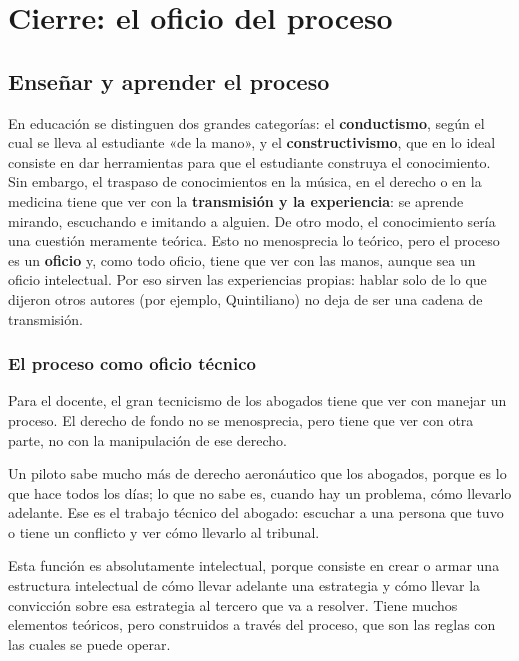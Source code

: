 \documentclass[12pt,oneside]{book}
\begin{document}
\chapter[Cierre: el oficio del proceso]{Cierre: el oficio del proceso}

\section{Enseñar y aprender el proceso}

En educación se distinguen dos grandes categorías: el \textbf{conductismo}, según el cual se lleva al estudiante «de la mano», y el \textbf{constructivismo}, que en lo ideal consiste en dar herramientas para que el estudiante construya el conocimiento. Sin embargo, el traspaso de conocimientos en la música, en el derecho o en la medicina tiene que ver con la \textbf{transmisión y la experiencia}: se aprende mirando, escuchando e imitando a alguien. De otro modo, el conocimiento sería una cuestión meramente teórica. Esto no menosprecia lo teórico, pero el proceso es un \textbf{oficio} y, como todo oficio, tiene que ver con las manos, aunque sea un oficio intelectual. Por eso sirven las experiencias propias: hablar solo de lo que dijeron otros autores (por ejemplo, Quintiliano) no deja de ser una cadena de transmisión.

\subsection{El proceso como oficio técnico}

\begin{important}
Para el docente, el gran tecnicismo de los abogados tiene que ver con manejar un proceso. El derecho de fondo no se menosprecia, pero tiene que ver con otra parte, no con la manipulación de ese derecho.
\end{important}

Un piloto sabe mucho más de derecho aeronáutico que los abogados, porque es lo que hace todos los días; lo que no sabe es, cuando hay un problema, cómo llevarlo adelante. Ese es el trabajo técnico del abogado: escuchar a una persona que tuvo o tiene un conflicto y ver cómo llevarlo al tribunal.

Esta función es absolutamente intelectual, porque consiste en crear o armar una estructura intelectual de cómo llevar adelante una estrategia y cómo llevar la convicción sobre esa estrategia al tercero que va a resolver. Tiene muchos elementos teóricos, pero construidos a través del proceso, que son las reglas con las cuales se puede operar.
\end{document}
